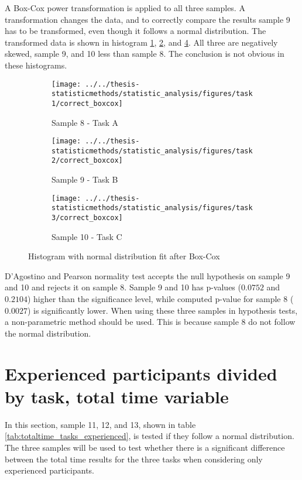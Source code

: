 \begin{appendices}
A Box-Cox power transformation is applied to all three samples. A transformation changes the data, and to correctly compare the results sample 9 has to be transformed, even though it follows a normal distribution. The transformed data is shown in histogram \ref{fig:correctboxcox_task1}, \ref{fig:correctboxcox_task2}, and \ref{fig:correctboxcox_task3}. All three are negatively skewed, sample 9, and 10 less than sample 8. The conclusion is not obvious in these histograms.

\begin{figure}[H]
	\centering
	\begin{subfigure}[b]{0.32\textwidth}
		\centering
		\texttt{[image: ../../thesis-statisticmethods/statistic\_analysis/figures/task1/correct\_boxcox]}
		\caption{Sample 8 - Task A}
		\label{fig:correctboxcox_task1}
	\end{subfigure}
	\begin{subfigure}[b]{0.32\textwidth}
		\centering
		\texttt{[image: ../../thesis-statisticmethods/statistic\_analysis/figures/task2/correct\_boxcox]}
		\caption{Sample 9 - Task B}
		\label{fig:correctboxcox_task2}
	\end{subfigure}
	\begin{subfigure}[b]{0.32\textwidth}
		\centering
		\texttt{[image: ../../thesis-statisticmethods/statistic\_analysis/figures/task3/correct\_boxcox]}
		\caption{Sample 10 - Task C}
		\label{fig:correctboxcox_task3}
	\end{subfigure}
	\caption{Histogram with normal distribution fit after Box-Cox}
\end{figure}

D'Agostino and Pearson normality test accepts the null hypothesis on sample 9 and 10 and rejects it on sample 8. Sample 9 and 10 has p-values ($0.0752$ and $0.2104$) higher than the significance level, while computed p-value for sample 8 ($0.0027$) is significantly lower. When using these three samples in hypothesis tests, a non-parametric method should be used. This is because sample 8 do not follow the normal distribution.

\section{Experienced participants divided by task, total time variable}\label{app:norm_11_12_13}

In this section, sample 11, 12, and 13, shown in table \ref{tab:totaltime_tasks_experienced}, is tested if they follow a normal distribution. The three samples will be used to test whether there is a significant difference between the total time results for the three tasks when considering only experienced participants. 


\end{appendices}
